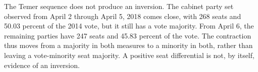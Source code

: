 \documentclass[11pt]{article}
\begin{document}

The Temer sequence does not produce an inversion. The cabinet party set
observed from April 2 through April 5, 2018 comes close, with 268 seats
and 50.03 percent of the 2014 vote, but it still has a vote majority.
From April 6, the remaining parties have 247 seats and 45.83 percent of
the vote. The contraction thus moves from a majority in both measures
to a minority in both, rather than leaving a vote-minority seat majority.
A positive seat differential is not, by itself, evidence of an inversion.

\end{document}
